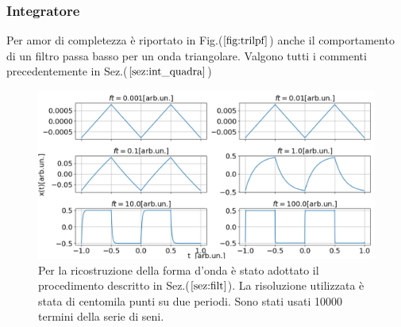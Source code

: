 \documentclass{article}
\begin{document}
        \subsubsection{Integratore}
            Per amor di completezza è riportato in Fig.($\ref{fig:trilpf}$) anche il comportamento di un filtro passa
            basso per un onda triangolare. Valgono tutti i commenti precedentemente in 
            Sez.($\ref{sez:int_quadra}$)
            \begin{figure}[H]
                \centering
                \includegraphics[width=1\textwidth]{fousharkfinsfts1.png} %
                \caption{Per la ricostruzione della forma d'onda è stato adottato 
                il procedimento descritto in Sez.($\ref{sez:filt}$).
                La risoluzione utilizzata è stata di centomila punti su due periodi.
                Sono stati usati 10000 termini della serie di seni.}
                \label{fig:trilpf}
            \end{figure}
\end{document}
